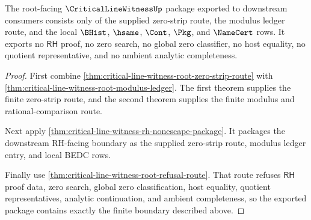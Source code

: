\begin{theorem}
\label{thm:critical-line-witness-root-nonescape-package}
The root-facing $\CriticalLineWitnessUp$ package exported to downstream consumers consists only of the supplied zero-strip route, the modulus ledger route, and the local $\BHist$, $\hsame$, $\Cont$, $\Pkg$, and $\NameCert$ rows. It exports no $\mathsf{RH}$ proof, no zero search, no global zero classifier, no host equality, no quotient representative, and no ambient analytic completeness.
\end{theorem}
\begin{proof}
First combine \autoref{thm:critical-line-witness-root-zero-strip-route} with \autoref{thm:critical-line-witness-root-modulus-ledger}. The first theorem supplies the finite zero-strip route, and the second theorem supplies the finite modulus and rational-comparison route.

Next apply \autoref{thm:critical-line-witness-rh-nonescape-package}. It packages the downstream RH-facing boundary as the supplied zero-strip route, modulus ledger entry, and local BEDC rows.

Finally use \autoref{thm:critical-line-witness-root-refusal-route}. That route refuses $\mathsf{RH}$ proof data, zero search, global zero classification, host equality, quotient representatives, analytic continuation, and ambient completeness, so the exported package contains exactly the finite boundary described above.
\end{proof}
